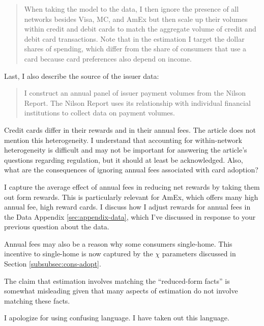 \documentclass[main.tex]{subfiles}
\begin{document}
\begin{refsection}
\begin{quotation}
    When taking the model to the data, I then ignore the presence of all networks besides Visa, MC, and AmEx but then scale up their volumes within credit and debit cards to match the aggregate volume of credit and debit card transactions.
Note that in the estimation I target the dollar shares of spending, which differ from the share of consumers that use a card because card preferences also depend on income.
\end{quotation}

Last, I also describe the source of the issuer data:
\begin{quote}
    I construct an annual panel of issuer payment volumes from the Nilson Report.
The Nilson Report uses its relationship with individual financial institutions to collect data on payment volumes.
\end{quote}

\begin{refcomment}
Credit cards differ in their rewards and in their annual fees.
The article does not mention this heterogeneity.
I understand that accounting for within-network heterogeneity is difficult and may not be important for answering the article’s questions regarding regulation, but it should at least be acknowledged.
Also, what are the consequences of ignoring annual fees associated with card adoption?
\end{refcomment}

\replypricediscrimination

I capture the average effect of annual fees in reducing net rewards by taking them out form rewards.
This is particularly relevant for AmEx, which offers many high annual fee, high reward cards.
I discuss how I adjust rewards for annual fees in the Data Appendix \ref{sec:appendix-data}, which I've discussed in response to your previous question about the data.

Annual fees may also be a reason why some consumers single-home.
This incentive to single-home is now captured by the $\chi$ parameters discussed in Section \ref{subsubsec:cons-adopt}.

\begin{refcommentnoclear}
The claim that estimation involves matching the “reduced-form facts” is somewhat misleading given that many aspects of estimation do not involve matching these facts.
\end{refcommentnoclear}

I apologize for using confusing language.
I have taken out this language.


\end{refsection}
\end{document}
